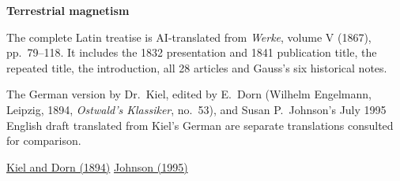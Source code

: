 \clearpage
\thispagestyle{empty}
\begin{center}\Large\textbf{Terrestrial magnetism}\end{center}
The complete Latin treatise is AI-translated from \textit{Werke}, volume V (1867), pp.~79--118. It includes the 1832 presentation and 1841 publication title, the repeated title, the introduction, all 28 articles and Gauss’s six historical notes.

The German version by Dr.~Kiel, edited by E.~Dorn (Wilhelm Engelmann, Leipzig, 1894, \textit{Ostwald’s Klassiker}, no.~53), and Susan P.~Johnson’s July 1995 English draft translated from Kiel’s German are separate translations consulted for comparison.

\noindent\href{https://archive.org/details/dieintensittde00gausuoft}{Kiel and Dorn (1894)}\quad
\href{https://21sci-tech.com/translations/gaussMagnetic.pdf}{Johnson (1995)}

\noindent
\clearpage

